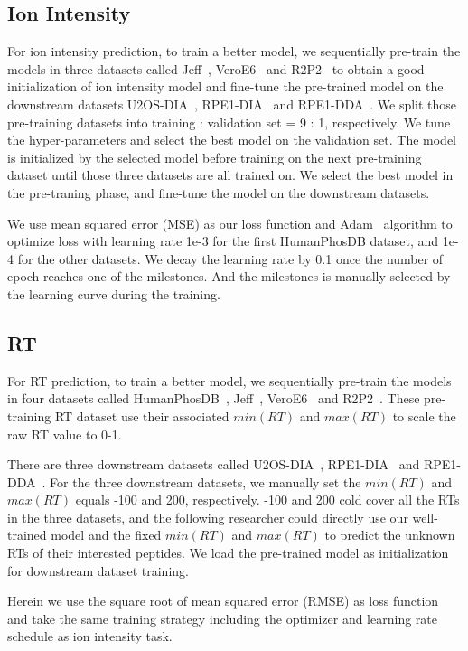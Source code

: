 

\subsection{Ion Intensity}
For ion intensity prediction, to train a better model, we sequentially pre-train the models in three datasets called Jeff~\cite{liu2018vivo}, VeroE6~\cite{bouhaddou2020global} and R2P2~\cite{leutert2019r2} to obtain a good initialization of ion intensity model and fine-tune the pre-trained model on the downstream datasets U2OS-DIA~\cite{wang2020naguider}, RPE1-DIA~\cite{bekker2020rapid} and RPE1-DDA~\cite{bekker2020rapid}. 
We split those pre-training datasets into training : validation set = 9 : 1, respectively. We tune the hyper-parameters and select the best model on the validation set. The model is initialized by the selected model before training on the next pre-training dataset until those three datasets are all trained on.
We select the best model in the pre-traning phase, and fine-tune the model on the downstream datasets.

We use mean squared error (MSE) as our loss function and Adam~\cite{kingma2017adam} algorithm to optimize loss with learning rate 1e-3 for the first HumanPhosDB dataset, and 1e-4 for the other datasets. We decay the learning rate by 0.1 once the number of epoch reaches one of the milestones. And the milestones is manually selected by the learning curve during the training. 


\subsection{RT}
For RT prediction, to train a better model, we sequentially pre-train the models in four datasets called 
HumanPhosDB~\cite{lawrence2016plug}, Jeff~\cite{liu2018vivo}, VeroE6~\cite{bouhaddou2020global}
and R2P2~\cite{leutert2019r2}.  These pre-training RT dataset use their associated $min(RT)$ and $max(RT)$ to scale the raw RT value to 0-1. 

There are three downstream datasets called U2OS-DIA~\cite{wang2020naguider}, RPE1-DIA~\cite{bekker2020rapid} and RPE1-DDA~\cite{bekker2020rapid}. For the three downstream datasets, we manually set the $min(RT)$ and $max(RT)$ equals -100 and 200, respectively. -100 and 200 cold cover all the RTs in the three datasets, and the following researcher could directly use our well-trained model and the fixed $min(RT)$ and $max(RT)$ to predict the unknown RTs of their interested peptides. We load the pre-trained model as initialization for downstream dataset training. 

Herein we use the square root of mean squared error (RMSE) as loss function and take the same training strategy including the optimizer and learning rate schedule as ion intensity task.